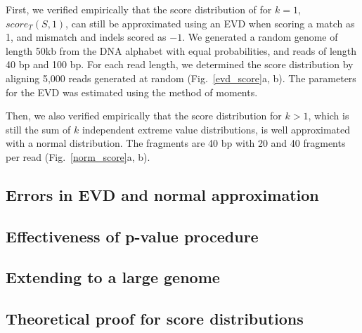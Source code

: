 First, we verified empirically that the score distribution of for $k=1$,
$score_T(S,1)$, can still be approximated using an EVD when scoring a
match as 1, and mismatch and indels scored as $-1$. We generated a random
genome of length 50kb from the DNA alphabet with equal probabilities,
and reads of length 40 bp and 100 bp. For each read length, we
determined the score distribution by aligning 5,000 reads generated at
random (Fig.~\ref{evd_score}a, b). The parameters for the EVD was
estimated using the method of moments.

Then, we also verified empirically that the score distribution for $k >
1$, which is still the sum of $k$ independent extreme value
distributions, is well approximated with a normal distribution. The
fragments are 40 bp with 20 and 40 fragments per read
(Fig.~\ref{norm_score}a, b).




\subsection*{Errors in EVD and normal approximation}

\subsection*{Effectiveness of p-value procedure}

\subsection*{Extending to a large genome}

\subsection*{Theoretical proof for score distributions}
